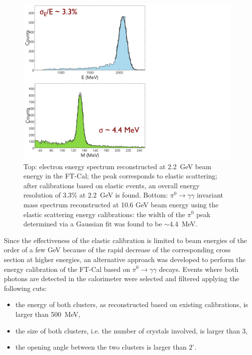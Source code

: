 \begin{figure}
\includegraphics[height=1.0\columnwidth]{fig/ftcal_elasticres.pdf}
\caption{Top: electron energy spectrum reconstructed at 2.2~GeV beam energy in the FT-Cal; the peak corresponds
  to elastic scattering; after calibrations based on elastic events, an overall energy resolution of 3.3\% at 2.2~GeV is
  found. Bottom: $\pi^0\to\gamma\gamma$ invariant mass spectrum reconstructed at 10.6 GeV beam energy using the
  elastic scattering energy calibrations: the width of the $\pi^0$ peak determined via a Gaussian fit was found to be
  $\sim$4.4~MeV.}
\label{fig:ftcal_elasticres}
\end{figure}

Since the effectiveness of the elastic calibration is limited to beam energies of the order of a few GeV because of
the rapid decrease of the corresponding cross section at higher energies, an alternative approach was developed to
perform the energy calibration of the FT-Cal based on $\pi^0\to\gamma\gamma$ decays. Events where both
photons are detected in the calorimeter were selected and filtered applying the following cuts:
\begin{itemize}
    \item the energy of both clusters, as reconstructed based on existing calibrations, is larger than 500~MeV,
    \item the size of both clusters, i.e. the number of crystals involved, is larger than 3,
    \item the opening angle between the two clusters is larger than $2^\circ$.
\end{itemize}

